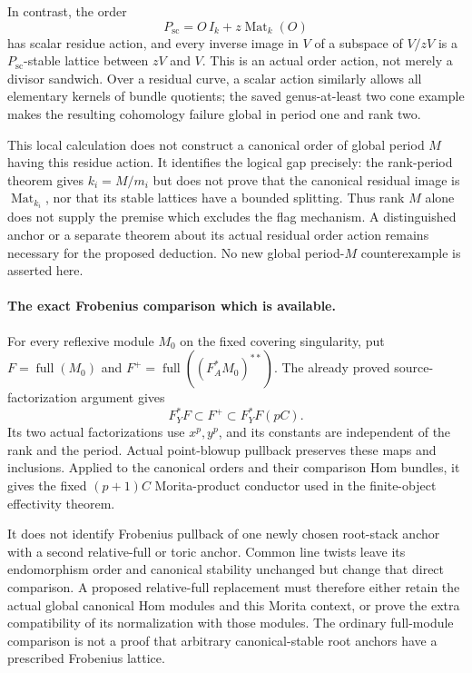 In contrast, the order
\[
              P_{\mathrm{sc}}=O\,I_k+z\operatorname{Mat}_k(O)
\]
has scalar residue action, and every inverse image in $V$ of a
subspace of $V/zV$ is a $P_{\mathrm{sc}}$-stable lattice between
$zV$ and $V$.  This is an actual order action, not merely a divisor
sandwich.  Over a residual curve, a scalar action similarly allows
all elementary kernels of bundle quotients; the saved genus-at-least
two cone example makes the resulting cohomology failure global in
period one and rank two.

This local calculation does not construct a canonical order of
global period $M$ having this residue action.  It identifies the
logical gap precisely: the rank-period theorem gives $k_i=M/m_i$
but does not prove that the canonical residual image is
$\operatorname{Mat}_{k_i}$, nor that its stable lattices have a
bounded splitting.  Thus rank $M$ alone does not supply the premise
which excludes the flag mechanism.  A distinguished anchor or a
separate theorem about its actual residual order action remains
necessary for the proposed deduction.  No new global period-$M$
counterexample is asserted here.

\paragraph{The exact Frobenius comparison which is available.}
For every reflexive module $M_0$ on the fixed covering singularity,
put $F=\operatorname{full}(M_0)$ and
$F^+=\operatorname{full}((F_A^*M_0)^{**})$.  The already proved
source-factorization argument gives
\[
                    F_Y^*F\subset F^+
                         \subset F_Y^*F(pC).
\]
Its two actual factorizations use $x^p,y^p$, and its constants are
independent of the rank and the period.  Actual point-blowup
pullback preserves these maps and inclusions.  Applied to the
canonical orders and their comparison Hom bundles, it gives the
fixed $(p+1)C$ Morita-product conductor used in the finite-object
effectivity theorem.

It does not identify Frobenius pullback of one newly chosen
root-stack anchor with a second relative-full or toric anchor.
Common line twists leave its endomorphism order and canonical
stability unchanged but change that direct comparison.  A proposed
relative-full replacement must therefore either retain the actual
global canonical Hom modules and this Morita context, or prove the
extra compatibility of its normalization with those modules.  The
ordinary full-module comparison is not a proof that arbitrary
canonical-stable root anchors have a prescribed Frobenius lattice.

